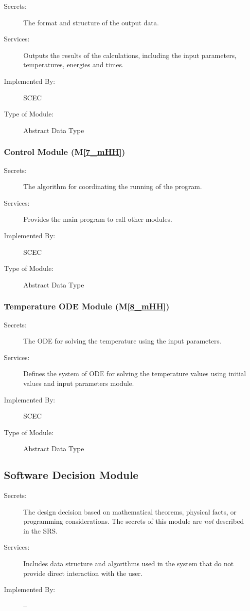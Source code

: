 \documentclass[12pt, titlepage]{article}
\newcommand{\mref}[1]{M\ref{#1}}
\begin{document}
\begin{description}
\item[Secrets:] The format and structure of the output data.
\item[Services:] Outputs the results of the calculations, including the input parameters, temperatures, energies and times.
\item[Implemented By:] SCEC
\item[Type of Module:] Abstract Data Type
\end{description}

\subsubsection{Control Module (\mref{7_mHH})}

\begin{description}
\item[Secrets:] The algorithm for coordinating the running of the program.
\item[Services:] Provides the main program to call other modules. 
\item[Implemented By:] SCEC
\item[Type of Module:] Abstract Data Type
\end{description}

\subsubsection{Temperature ODE Module (\mref{8_mHH})}

\begin{description}
\item[Secrets:] The ODE for solving the temperature using the input parameters.
\item[Services:] Defines the system of ODE for solving the temperature values using initial values and input parameters module. 
\item[Implemented By:] SCEC
\item[Type of Module:] Abstract Data Type
\end{description}


\subsection{Software Decision Module}

\begin{description}
\item[Secrets:] The design decision based on mathematical theorems, physical
  facts, or programming considerations. The secrets of this module are
  \emph{not} described in the SRS.
\item[Services:] Includes data structure and algorithms used in the system that
  do not provide direct interaction with the user. 
\item[Implemented By:] --
\end{description}
\end{document}
